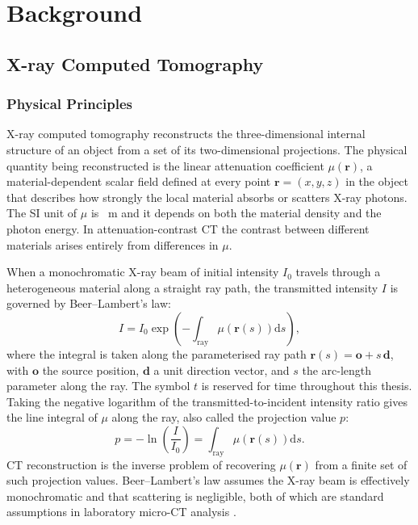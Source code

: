 \documentclass[12pt, a4paper, twoside]{report}
\begin{document}
\chapter{Background}
\label{chap:background}

\section{X-ray Computed Tomography}
\label{sec:ct}

\subsection{Physical Principles}
\label{subsec:ct_physics}

X-ray computed tomography reconstructs the three-dimensional internal structure of an object from a set of its two-dimensional projections. The physical quantity being reconstructed is the linear attenuation coefficient $\mu(\mathbf{r})$, a material-dependent scalar field defined at every point $\mathbf{r} = (x, y, z)$ in the object that describes how strongly the local material absorbs or scatters X-ray photons. The SI unit of $\mu$ is \si{\per\metre} and it depends on both the material density and the photon energy. In attenuation-contrast CT the contrast between different materials arises entirely from differences in $\mu$.

When a monochromatic X-ray beam of initial intensity $I_0$ travels through a heterogeneous material along a straight ray path, the transmitted intensity $I$ is governed by Beer--Lambert's law:
%
\begin{equation}
    I = I_0 \exp\!\left(-\int_{\mathrm{ray}} \mu\!\left(\mathbf{r}(s)\right) \mathrm{d}s\right),
    \label{eq:beer_lambert}
\end{equation}
%
where the integral is taken along the parameterised ray path $\mathbf{r}(s) = \mathbf{o} + s\,\mathbf{d}$, with $\mathbf{o}$ the source position, $\mathbf{d}$ a unit direction vector, and $s$ the arc-length parameter along the ray. The symbol $t$ is reserved for time throughout this thesis. Taking the negative logarithm of the transmitted-to-incident intensity ratio gives the line integral of $\mu$ along the ray, also called the projection value $p$:
%
\begin{equation}
    p = -\ln\!\left(\frac{I}{I_0}\right) = \int_{\mathrm{ray}} \mu\!\left(\mathbf{r}(s)\right) \mathrm{d}s.
    \label{eq:projection_value}
\end{equation}
%
CT reconstruction is the inverse problem of recovering $\mu(\mathbf{r})$ from a finite set of such projection values. Beer--Lambert's law assumes the X-ray beam is effectively monochromatic and that scattering is negligible, both of which are standard assumptions in laboratory micro-CT analysis \citep{kak2001principles}.
\end{document}
